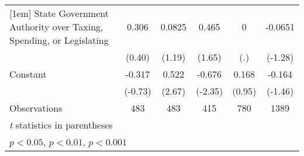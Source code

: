 {\begin{tabular*}{\linewidth}{@{\hskip\tabcolsep\extracolsep\fill}l*{5}{c}}
[1em]
State Government Authority over Taxing, Spending, or Legislating&    0.306         &   0.0825         &    0.465         &        0         &  -0.0651         \\
                &   (0.40)         &   (1.19)         &   (1.65)         &      (.)         &  (-1.28)         \\
[1em]
Constant        &   -0.317         &    0.522\sym{**} &   -0.676\sym{*}  &    0.168         &   -0.164         \\
                &  (-0.73)         &   (2.67)         &  (-2.35)         &   (0.95)         &  (-1.46)         \\
\hline
Observations    &      483         &      483         &      415         &      780         &     1389         \\
\hline\hline
\multicolumn{6}{l}{\footnotesize \textit{t} statistics in parentheses}\\
\multicolumn{6}{l}{\footnotesize \sym{*} \(p<0.05\), \sym{**} \(p<0.01\), \sym{***} \(p<0.001\)}\\
\end{tabular*}
}
